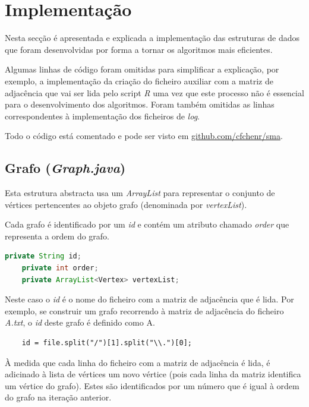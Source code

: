 \documentclass[a4paper,12pt]{report}
\begin{document}
\chapter{Implementação}

Nesta secção é apresentada e explicada a implementação das estruturas de dados que foram desenvolvidas por forma a tornar os algoritmos mais eficientes.

Algumas linhas de código foram omitidas para simplificar a explicação, por exemplo, a implementação da criação do ficheiro auxiliar com a matriz de adjacência que vai ser lida pelo script \textit{R} uma vez que este processo não é essencial para o desenvolvimento dos algoritmos.
Foram também omitidas as linhas correspondentes à implementação dos ficheiros de \textit{log}.

Todo o código está comentado e pode ser visto em  \href{https://github.com/cfchenr/sma}{github.com/cfchenr/sma}.

\section{Grafo (\textit{Graph.java})}

Esta estrutura abstracta usa um \textit{ArrayList} para representar o conjunto de vértices pertencentes ao objeto grafo (denominada por \textit{vertexList}).

Cada grafo é identificado por um \textit{id} e contém um atributo chamado \textit{order} que representa a ordem do grafo.

\begin{lstlisting}[language=Java]
    private String id;
    private int order;
    private ArrayList<Vertex> vertexList;
\end{lstlisting}

Neste caso o \textit{id} é o nome do ficheiro com a matriz de adjacência que é lida. Por exemplo, se construir um grafo recorrendo à matriz de adjacência do ficheiro \textit{A.txt}, o \textit{id} deste grafo é definido como A.

\begin{lstlisting}
    id = file.split("/")[1].split("\\.")[0];
\end{lstlisting}

À medida que cada linha do ficheiro com a matriz de adjacência é lida, é adicinado à lista de vértices um novo vértice (pois cada linha da matriz identifica um vértice do grafo). Estes são identificados por um número que é igual à ordem do grafo na iteração anterior.
\end{document}
